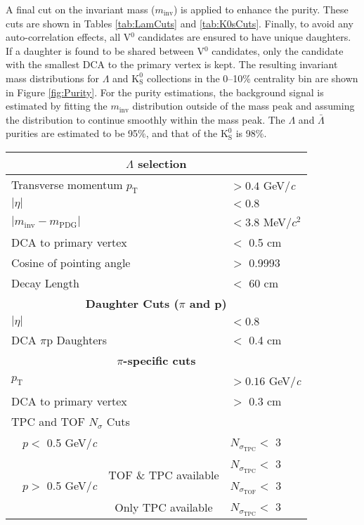 \documentclass[ALICE,manyauthors]{cernphprep}
\newcommand{\minv}{$m_{\mathrm{inv}}$\xspace}
\newcommand{\Lam}{$\Lambda$\xspace}
\newcommand{\ALam}{$\bar{\Lambda}$\xspace}
\newcommand{\Ks}{$\mathrm{K^{0}_{S}}$\xspace}
\newcommand{\Vz}{V$^{0}$\xspace}
\begin{document}
A final cut on the invariant mass (\minv) is applied to enhance the purity.
These cuts are shown in Tables \ref{tab:LamCuts} and \ref{tab:K0sCuts}.
Finally, to avoid any auto-correlation effects, all \Vz candidates are ensured to have unique daughters. 
If a daughter is found to be shared between \Vz candidates, only the candidate with the smallest DCA to the primary vertex is kept.
The resulting invariant mass distributions for \Lam and \Ks collections in the 0--10\% centrality bin are shown in Figure \ref{fig:Purity}.
For the purity estimations, the background signal is estimated by fitting the \minv distribution outside of the mass peak and assuming the distribution to continue smoothly within the mass peak.
The \Lam and \ALam purities are estimated to be 95\%, and that of the \Ks is 98\%.

\begin{table}[htbp]
 \centering 
  \begin{tabular}{lc|c|l}
   \hline  
   \multicolumn{4}{c}{\textbf{\Lam selection}} \\
   \hline
   \multicolumn{3}{l|}{Transverse momentum $p_{\mathrm{T}}$} & $> 0.4$ GeV/\textit{c} \\
   \hline
   \multicolumn{3}{l|}{$|\eta|$} & $< 0.8$ \\
   \hline
   \multicolumn{3}{l|}{$|m_{\mathrm{inv}} - m_{\mathrm{PDG}}|$} & $< 3.8$ MeV/$c^{2}$ \\ 
   \hline
   \multicolumn{3}{l|}{DCA to primary vertex} & $<$ 0.5 cm \\
   \hline
   \multicolumn{3}{l|}{Cosine of pointing angle} & $>$ 0.9993 \\
   \hline
   \multicolumn{3}{l|}{Decay Length} & $<$ 60 cm \\
   \hline
   
   
   \multicolumn{4}{c}{\textbf{Daughter Cuts ($\pi$ and p)}} \\
   \hline
   \multicolumn{3}{l|}{$|\eta|$} &  $< 0.8$ \\
   \hline
   \multicolumn{3}{l|}{DCA $\pi$p Daughters} & $<$ 0.4 cm \\
   \hline
   
   
   \multicolumn{4}{c}{\textbf{$\pi$-specific cuts}} \\
   \hline
   \multicolumn{3}{l|}{$p_{\mathrm{T}}$} & $> 0.16$ GeV/\textit{c} \\
   \hline
   \multicolumn{3}{l|}{DCA to primary vertex} & $>$ 0.3 cm \\
   \hline
   \multicolumn{4}{l}{TPC and TOF $N_{\sigma}$ Cuts} \\
    & \multicolumn{1}{c}{$p <$ 0.5 GeV/\textit{c}} &  & $N_{\sigma_{\mathrm{TPC}}} <$ 3 \\
   \cline{2-4}
    & \multicolumn{1}{c}{\multirow{3}{*}{$p >$ 0.5 GeV/\textit{c}}} &  \multirow{2}{*}{TOF \& TPC available} & $N_{\sigma_{\mathrm{TPC}}} <$ 3 \\
    & \multicolumn{2}{c|}{} & $N_{\sigma_{\mathrm{TOF}}} <$ 3 \\
   \cline{3-4}
    & \multicolumn{1}{c}{} & Only TPC available & $N_{\sigma_{\mathrm{TPC}}} <$ 3 \\
   \hline
   

\end{tabular}
\end{table}
\end{document}
